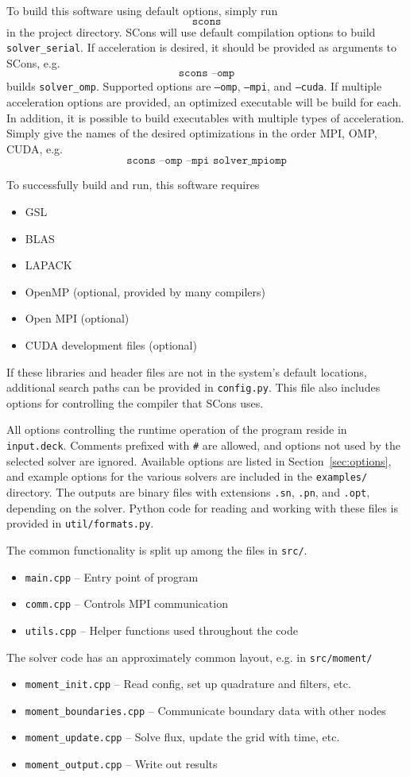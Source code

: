 \documentclass{article}
\begin{document}
To build this software using default options, simply run \[\texttt{scons}\]
in the
project directory. SCons will use default compilation options to build
\texttt{solver\_serial}. If acceleration is desired, it should be provided as
arguments to SCons, e.g. \[\texttt{scons --omp}\] builds \texttt{solver\_omp}.
Supported options are
\texttt{--omp}, \texttt{--mpi}, and \texttt{--cuda}. If multiple acceleration
options are provided, an optimized executable will be build for each.
In addition, it is possible to build executables with multiple types of
acceleration. Simply give the names of the desired optimizations in the order
MPI, OMP, CUDA, e.g. \[\texttt{scons --omp --mpi solver\_mpiomp}\]

To successfully build and run, this software requires
\begin{itemize}
 \item GSL
 \item BLAS
 \item LAPACK
 \item OpenMP (optional, provided by many compilers)
 \item Open MPI (optional)
 \item CUDA development files (optional)
\end{itemize}
If these libraries and header files are not in the system's default locations,
additional search paths can be provided in \texttt{config.py}. This file also
includes options for controlling the compiler that SCons uses.

All options controlling the runtime operation of the program reside in
\texttt{input.deck}. Comments prefixed with \texttt{\#} are allowed,
and options not used by the selected solver are ignored. Available options are
listed in Section~\ref{sec:options}, and example options for the various
solvers are included in the \texttt{examples/} directory.
The outputs are binary files with
extensions \texttt{.sn}, \texttt{.pn}, and \texttt{.opt}, depending on
the solver. Python code for reading and working with these files is provided
in \texttt{util/formats.py}.

The common functionality is split up among the files in \texttt{src/}.
\begin{itemize}
 \item \texttt{main.cpp} -- Entry point of program
 \item \texttt{comm.cpp} -- Controls MPI communication
 \item \texttt{utils.cpp} -- Helper functions used throughout the code
 \end{itemize}
The solver code has an approximately common layout, e.g. in \texttt{src/moment/}
\begin{itemize}
 \item \texttt{moment\_init.cpp} -- Read config, set up quadrature and filters, etc.
 \item \texttt{moment\_boundaries.cpp} -- Communicate boundary data with other nodes
 \item \texttt{moment\_update.cpp} -- Solve flux, update the grid with time, etc.
 \item \texttt{moment\_output.cpp} -- Write out results
\end{itemize}
\end{document}
